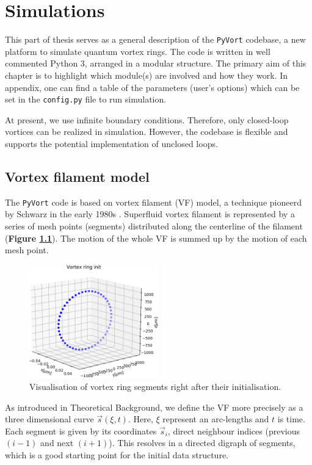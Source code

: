 \chapter{Simulations}

This part of thesis serves as a general description of the \texttt{PyVort} codebase, a new platform to simulate quantum vortex rings. The code is written in well commented Python 3, arranged in a modular structure. The primary aim of this chapter is to highlight which module(s) are involved and how they work.
In appendix, one can find a table of the parameters (user's options) which can be set in the \texttt{config.py} file to run simulation.

At present, we use infinite boundary conditions. Therefore, only closed-loop vortices can be realized in simulation. However, the codebase is flexible and supports the potential implementation of unclosed loops.

\section{Vortex filament model}

The \texttt{PyVort} code is based on vortex filament (VF) model, a technique pioneerd by Schwarz in the early 1980s \cite{schwarz_filament}. Superfluid vortex filament is represented by a series of mesh points (segments) distributed along the centerline of the filament (\textbf{Figure \ref{example_ring}}). The motion of the whole VF is summed up by the motion of each mesh point.

\begin{figure}[h]
	\centering
	\includegraphics[width=0.5\textwidth]{graphics/simul/ring_init_crop}
	\caption{Visualisation of vortex ring segments right
after their initialisation.}
	\label{example_ring}
\end{figure}

As introduced in Theoretical Background, we define the VF more precisely as a three dimensional curve $\vec{s}(\xi, t)$. Here, $\xi$ represent an arc-lengths and $t$ is time. Each segment is given by its coordinates $\vec{s}_i$, direct neighbour indices (previous $(i-1)$ and next $(i+1)$). This resolves in a directed digraph of segments, which is a good starting point for the initial data structure.

